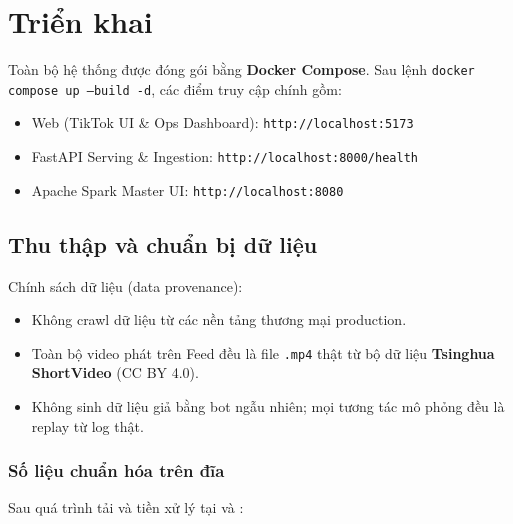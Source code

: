 \chapter{Triển khai}

Toàn bộ hệ thống được đóng gói bằng \textbf{Docker Compose}. Sau lệnh \texttt{docker compose up --build -d}, các điểm truy cập chính gồm:

\begin{itemize}
  \item Web (TikTok UI \& Ops Dashboard): \texttt{http://localhost:5173}
  \item FastAPI Serving \& Ingestion: \texttt{http://localhost:8000/health}
  \item Apache Spark Master UI: \texttt{http://localhost:8080}
\end{itemize}

\section{Thu thập và chuẩn bị dữ liệu}

Chính sách dữ liệu (data provenance):
\begin{itemize}
  \item Không crawl dữ liệu từ các nền tảng thương mại production.
  \item Toàn bộ video phát trên Feed đều là file \texttt{.mp4} thật từ bộ dữ liệu \textbf{Tsinghua ShortVideo} (CC BY 4.0).
  \item Không sinh dữ liệu giả bằng bot ngẫu nhiên; mọi tương tác mô phỏng đều là replay từ log thật.
\end{itemize}

\subsection*{Số liệu chuẩn hóa trên đĩa}

Sau quá trình tải và tiền xử lý tại  và :

